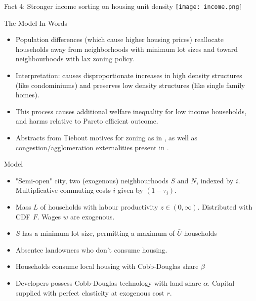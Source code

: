 \documentclass{beamer}
\theoremstyle{plain}
\begin{document}
\begin{frame}{Fact 4: Stronger income sorting on housing unit density}
\texttt{[image: income.png]}
\end{frame}

\begin{frame}{The Model In Words}
\begin{itemize}
	\color{black}
	\itemsep1em
	\item Population differences (which cause higher housing prices) reallocate households away from neighborhoods with minimum lot sizes and toward neighbourhoods with lax zoning policy. \pause
	\item \color{red}Interpretation\color{black}: causes disproportionate increases in high density structures (like condominiums) and preserves low density structures (like single family homes). \pause
	\item This process causes additional welfare inequality for low income households, and harms relative to Pareto efficient outcome. \pause
	\item \color{red} Abstracts from Tiebout motives for zoning as in \cite{calabresetal}, as well as congestion/agglomeration externalities present in \cite{berlinwall}. 
\end{itemize}
\end{frame}

\begin{frame}{Model}
	\begin{itemize}
		\color{black}
		\itemsep1em
		\item "Semi-open" city, two (exogenous) neighbourhoods $S$ and $N$, indexed by $i$. Multiplicative commuting costs $i$ given by $(1-\tau_{i})$. \pause
		\item Mass $L$ of households with labour productivity $z \in (0, \infty)$. Distributed with CDF $F$. Wages $w$ are exogenous. \pause
		\item $S$ has a minimum lot size, permitting a maximum of $\bar{U}$ households \pause
		\item Absentee landowners who don't consume housing. \pause
		\item Households consume local housing with Cobb-Douglas share $\beta$  \pause
		\item Developers possess Cobb-Douglas technology with land share $\alpha$. Capital supplied with perfect elasticity at exogenous cost $r$. 
	\end{itemize}
\end{frame}
\end{document}

